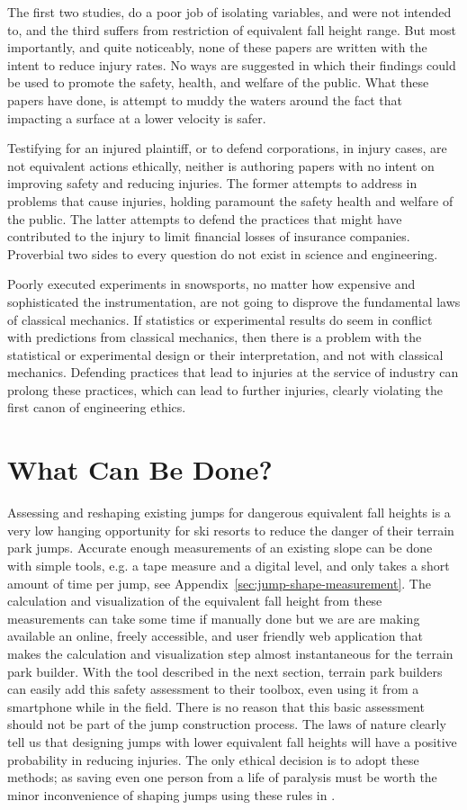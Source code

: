 \documentclass{article}
\begin{document}
The first two studies, do a poor job of isolating variables, and were not
intended to, and the third suffers from restriction of equivalent fall height
range. But most importantly, and quite noticeably, none of these papers are
written with the intent to reduce injury rates. No ways are suggested in which
their findings could be used to promote the safety, health, and welfare of the
public. What these papers have done, is attempt to muddy the waters around the
fact that impacting a surface at a lower velocity is safer.

Testifying for an injured plaintiff, or to defend corporations, in injury
cases, are not equivalent actions ethically, neither is authoring papers with
no intent on improving safety and reducing injuries. The former attempts to
address in problems that cause injuries, holding paramount the safety health
and welfare of the public. The latter attempts to defend the practices that
might have contributed to the injury to limit financial losses of insurance
companies. Proverbial two sides to every question do not exist in science and
engineering.

Poorly executed experiments in snowsports, no matter how expensive and
sophisticated the instrumentation, are not going to disprove the fundamental
laws of classical mechanics. If statistics or experimental results do seem in
conflict with predictions from classical mechanics, then there is a problem
with the statistical or experimental design or their interpretation, and not
with classical mechanics. Defending practices that lead to injuries at the
service of industry can prolong these practices, which can lead to further
injuries, clearly violating the first canon of engineering ethics.

\section{What Can Be Done?}
%
Assessing and reshaping existing jumps for dangerous equivalent fall heights is
a very low hanging opportunity for ski resorts to reduce the danger of their
terrain park jumps. Accurate enough measurements of an existing slope can be
done with simple tools, e.g. a tape measure and a digital level, and only takes
a short amount of time per jump, see Appendix~\ref{sec:jump-shape-measurement}.
The calculation and visualization of the equivalent fall height from these
measurements can take some time if manually done but we are are making
available an online, freely accessible, and user friendly web application that
makes the calculation and visualization step almost instantaneous for the
terrain park builder. With the tool described in the next section, terrain park
builders can easily add this safety assessment to their toolbox, even using it
from a smartphone while in the field. There is no reason that this basic
assessment should not be part of the jump construction process. The laws of
nature clearly tell us that designing jumps with lower equivalent fall heights
will have a positive probability in reducing injuries.  The only ethical
decision is to adopt these methods; as saving even one person from a life of
paralysis must be worth the minor inconvenience of shaping jumps using these
rules in \cite{Levy2015}.
\end{document}
